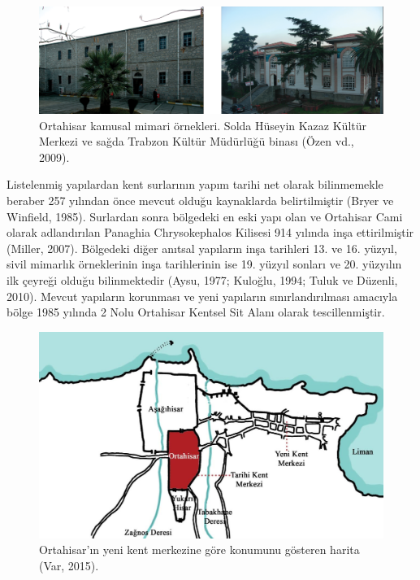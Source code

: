 \documentclass[12pt,turkish,a4paperpaper,]{report}
\begin{document}
\begin{figure}
\centering
\includegraphics[width=1\textwidth,height=\textheight]{source/figures/KamusalMimari.png}
\caption{Ortahisar kamusal mimari örnekleri. Solda Hüseyin Kazaz Kültür
Merkezi ve sağda Trabzon Kültür Müdürlüğü binası (Özen vd., 2009).}
\end{figure}

Listelenmiş yapılardan kent surlarının yapım tarihi net olarak
bilinmemekle beraber 257 yılından önce mevcut olduğu kaynaklarda
belirtilmiştir (Bryer ve Winfield, 1985). Surlardan sonra bölgedeki en
eski yapı olan ve Ortahisar Cami olarak adlandırılan Panaghia
Chrysokephalos Kilisesi 914 yılında inşa ettirilmiştir (Miller, 2007).
Bölgedeki diğer anıtsal yapıların inşa tarihleri 13. ve 16. yüzyıl,
sivil mimarlık örneklerinin inşa tarihlerinin ise 19. yüzyıl sonları ve
20. yüzyılın ilk çeyreği olduğu bilinmektedir (Aysu, 1977; Kuloğlu,
1994; Tuluk ve Düzenli, 2010). Mevcut yapıların korunması ve yeni
yapıların sınırlandırılması amacıyla bölge 1985 yılında 2 Nolu Ortahisar
Kentsel Sit Alanı olarak tescillenmiştir.

\begin{figure}
\centering
\includegraphics[width=1\textwidth,height=\textheight]{source/figures/ortahisar.jpg}
\caption{Ortahisar'ın yeni kent merkezine göre konumunu gösteren harita
(Var, 2015).}
\end{figure}
\end{document}
